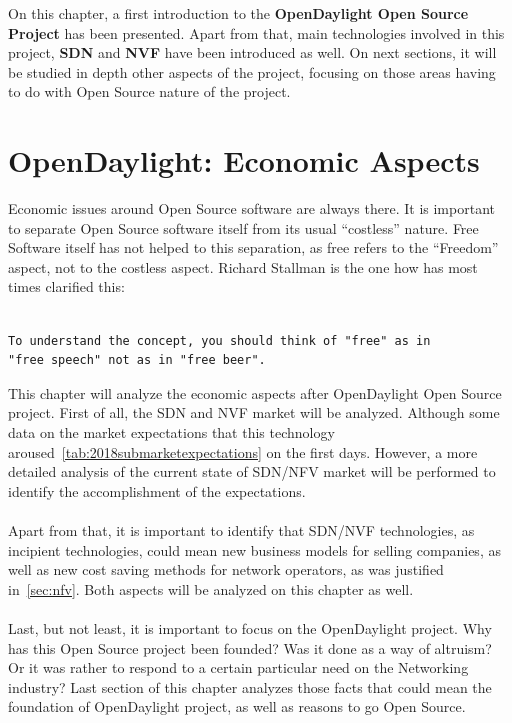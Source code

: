 \documentclass[a4paper, 12pt]{book}
\begin{document}
On this chapter, a first introduction to the \textbf{OpenDaylight Open Source Project} has been presented. Apart from that, main technologies involved in this project, \textbf{SDN} and \textbf{NVF} have been introduced as well. On next sections, it will be studied in depth other aspects of the project, focusing on those areas having to do with Open Source nature of the project.

\chapter{OpenDaylight: Economic Aspects}
\label{chap:odleconomic}

Economic issues around Open Source software are always there. It is important to separate Open Source software itself from its usual ``costless'' nature. Free Software itself has not helped to this separation, as free refers to the ``Freedom'' aspect, not to the costless aspect. Richard Stallman is the one how has most times clarified this:
\begin{verbatim}

To understand the concept, you should think of "free" as in
"free speech" not as in "free beer".

\end{verbatim}
This chapter will analyze the economic aspects after OpenDaylight Open Source project. First of all, the SDN and NVF market will be analyzed. Although some data on the market expectations that this technology aroused~\ref{tab:2018submarketexpectations} on the first days. However, a more detailed analysis of the current state of SDN/NFV market will be performed to identify the accomplishment of the expectations.\\
\\
Apart from that, it is important to identify that SDN/NVF technologies, as incipient technologies, could mean new business models for selling companies, as well as new cost saving methods for network operators, as was justified in~\ref{sec:nfv}. Both aspects will be analyzed on this chapter as well.\\
\\
Last, but not least, it is important to focus on the OpenDaylight project. Why has this Open Source project been founded? Was it done as a way of altruism? Or it was rather to respond to a certain particular need on the Networking industry? Last section of this chapter analyzes those facts that could mean the foundation of OpenDaylight project, as well as reasons to go Open Source.
\end{document}
